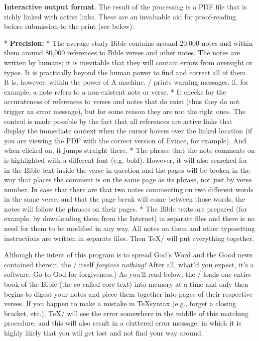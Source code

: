{  {\bf Interactive output format}.
  The result of the processing is a PDF file that is richly linked with active links. 
  These are an invaluable aid for proof-reading  before submission to the print (see below).

* {\bf Precision:} \begitems
  * The average study Bible contains around 20,000 notes and within them around 80,000
  references to Bible verses and other notes. The notes are written by humans; it is inevitable  that  they will contain errors from oversight or typos. It is practically beyond the human power 
  to find and correct  all of them. It is, however, within the power of A machine. \OpBible/ prints warning messages,  if, for example, a note refers to a non-existent note or verse.
*  It  checks for the accurateness of references to verses and notes that do exist (thus they do 
   not trigger an error message),
    but for some reason they are not the right ones.
    The control is made possible by the fact that all references are active links that display the immediate context when the cursor hovers over
   the linked location (if you are viewing the PDF with the correct version of Evince, for example). And when clicked on, it jumps straight there. 
  * The phrase that the note comments on is highlighted with a different font (e.g. bold).
    However, it will also searched for in the Bible text inside the verse in question and the pages will be broken in the way that places  the comment is on the same page as its phrase, not just by verse number.
    In case that there are  that two notes commenting on two different words in the same verse, and that    the page break will come between those words,  the notes will follow
   the phrases on their pages. %
   * The Bible texts are prepared (for example, by downloading them from the Internet) in separate files and there is no need for them to be modified in any way. All notes on them and other typesetting instructions are written in separate files. Then \TeX/ will put everything together.
    \enditems
\enditems

\lookout
Although the intent of this program is to spread God's Word and the Good news contained therein, the \OpBible/ itself {\it forgives nothing!} 
After all, what'd you expect, it's a software. Go to God for forgiveness.) As you'll read below, the \OpBible/ loads one entire book of the Bible (the so-called core text) into memory at a time and only then  begins to digest your notes and piece them together into pages of their respective verses. If you happen to make a mistake in \TeX syntax (e.g., forget a closing bracket, etc.), \TeX/ will see the error somewhere in the middle of this matching procedure, and this will also result in a cluttered error message, in which it is highly likely that you will get lost and not find your way around.

}
